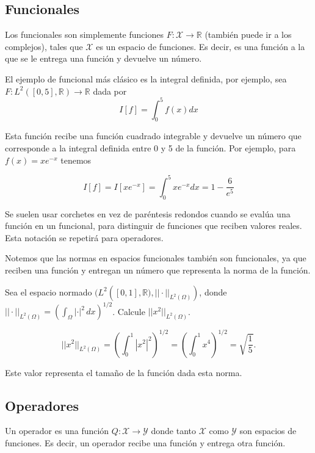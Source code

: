 \documentclass[12pt]{book}
\begin{document}
\subsection{Funcionales}
\noindent
Los funcionales son simplemente funciones $F:\mathcal{X} \to \mathbb{R}$ (también puede ir a los complejos), tales que $\mathcal{X}$ es un espacio de funciones. Es decir, es una función a la que se le entrega una función y devuelve un número.\\

\begin{exampleenv}

El ejemplo de funcional más clásico es la integral definida, por ejemplo, sea $F:L^2([0,5],\mathbb{R})\to \mathbb{R}$ dada por
\[
    I[f]=\int_0^5 f(x)dx
\]

Esta función recibe una función cuadrado integrable y devuelve un número que corresponde a la integral definida entre 0 y 5 de la función. Por ejemplo, para $f(x)=xe^{-x}$ tenemos

\[
    I[f]=I[xe^{-x}]=\int_0^5 xe^{-x} dx = 1-\frac{6}{e^5}
\]
\end{exampleenv}

Se suelen usar corchetes en vez de paréntesis redondos cuando se evalúa una función en un funcional, para distinguir de funciones que reciben valores reales. Esta notación se repetirá para operadores.

Notemos que las normas en espacios funcionales también son funcionales, ya que reciben una función y entregan un número que representa la norma de la función.\\

\begin{exampleenv}

Sea el espacio normado $(L^2([0,1],\mathbb{R)},||\cdot ||_{L^2(\Omega)})$, donde $||\cdot||_{L^2(\Omega)}=(\int_\Omega |\cdot|^2\,dx)^{1/2}$. Calcule $||x^2||_{L^2(\Omega)}$.

\[
    ||x^2||_{L^2(\Omega)}=\left(\int_0^1 |x^2|^2\right)^{1/2}=\left(\int_0^1 x^4\right)^{1/2} = \sqrt{\frac{1}{5}}.
\]

Este valor representa el tamaño de la función dada esta norma.
\end{exampleenv}

\subsection{Operadores}
\noindent
Un operador es una función $Q:\mathcal{X}\to \mathcal{Y}$ donde tanto $\mathcal{X}$ como $\mathcal{Y}$ son espacios de funciones. Es decir, un operador recibe una función y entrega otra función.\\
\end{document}
